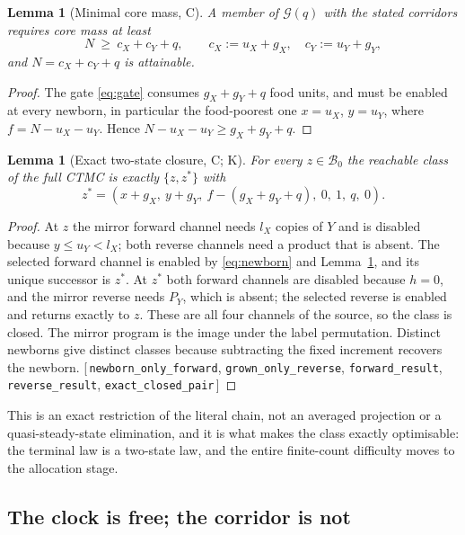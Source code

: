 \documentclass[11pt]{article}
\theoremstyle{plain}
\newtheorem{lemma}[theorem]{Lemma}
\theoremstyle{definition}
\theoremstyle{remark}
\newcommand{\leanref}[1]{{\normalfont\sffamily\footnotesize[\,#1\,]}}
\begin{document}
\begin{lemma}[Minimal core mass, C]\label{lem:core}
A member of $\mathcal{G}(q)$ with the stated corridors requires core mass at
least
\begin{equation}\label{eq:core}
N\ \ge\ c_X+c_Y+q,\qquad c_X:=u_X+g_X,\quad c_Y:=u_Y+g_Y,
\end{equation}
and $N=c_X+c_Y+q$ is attainable.
\end{lemma}

\begin{proof}
The gate \eqref{eq:gate} consumes $g_X+g_Y+q$ food units, and must be enabled
at every newborn, in particular the food-poorest one $x=u_X$, $y=u_Y$, where
$f=N-u_X-u_Y$. Hence $N-u_X-u_Y\ge g_X+g_Y+q$. \end{proof}

\begin{lemma}[Exact two-state closure, C; K]\label{lem:closure}
For every $z\in\mathcal{B}_0$ the reachable class of the full CTMC is exactly
$\{z,z^{*}\}$ with
\[
z^{*}=(x+g_X,\ y+g_Y,\ f-(g_X+g_Y+q),\ 0,\ 1,\ q,\ 0).
\]
\end{lemma}

\begin{proof}
At $z$ the mirror forward channel needs $l_X$ copies of $Y$ and is disabled
because $y\le u_Y<l_X$; both reverse channels need a product that is absent.
The selected forward channel is enabled by \eqref{eq:newborn} and
Lemma~\ref{lem:core}, and its unique successor is $z^{*}$. At $z^{*}$ both
forward channels are disabled because $h=0$, and the mirror reverse needs
$P_Y$, which is absent; the selected reverse is enabled and returns exactly to
$z$. These are all four channels of the source, so the class is closed. The
mirror program is the image under the label permutation. Distinct newborns
give distinct classes because subtracting the fixed increment recovers the
newborn. \leanref{\texttt{newborn\_only\_forward},
\texttt{grown\_only\_reverse}, \texttt{forward\_result},
\texttt{reverse\_result}, \texttt{exact\_closed\_pair}}
\end{proof}

This is an exact restriction of the literal chain, not an averaged projection
or a quasi-steady-state elimination, and it is what makes the class exactly
optimisable: the terminal law is a two-state law, and the entire finite-count
difficulty moves to the allocation stage.

\subsection{The clock is free; the corridor is not}
\end{document}

